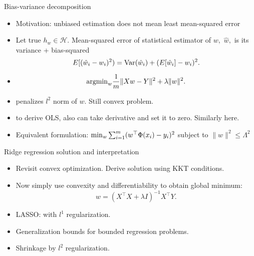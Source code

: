\documentclass[final]{beamer}
\begin{document}
\begin{frame}{Bias-variance decomposition}
	\begin{itemize}
		\item Motivation: unbiased estimation does not mean least mean-squared error
		\pause
	\item Let true $h_w \in \mathcal{H}.$ Mean-squared error of statistical estimator of $w,$ $\hat{w},$ is its variance + bias-squared
		$$E[(\hat{w}_i - w_i)^2) = {\rm Var}(\hat{w}_i) + (E[\hat{w}_i] - w_i)^2.$$
		\item 
	$$ {\rm arg min}_{w} \dfrac{1}{m} \|X w - Y\|^2 + \lambda \|w\|^2.$$
		\pause
	\item penalizes $l^2$ norm of $w$. Still convex problem.
	\pause 
	\item to derive OLS, also can take derivative and set it to zero. Similarly here.
	\pause
\item Equivalent formulation:
	$ {\rm min}_w \sum_{i=1}^m (w^\top \Phi(x_i) - y_i)^2$ subject to $\|w\|^2 \leq \Lambda^2$
	\end{itemize}
\end{frame}
\begin{frame}{Ridge regression solution and interpretation}
	\begin{itemize}
		\item Revisit convex optimization. Derive solution using KKT conditions.
		\pause
		\item Now simply use convexity and differentiability to obtain global minimum:
			$$w = (X^\top X + \lambda I)^{-1} X^\top Y.$$ 
		\pause
		\item LASSO: with $l^1$ regularization.
		\pause
		\item Generalization bounds for bounded regression problems.
		\pause 
	\item Shrinkage by $l^2$ regularization.
	\end{itemize}

\end{frame}
\end{document}
